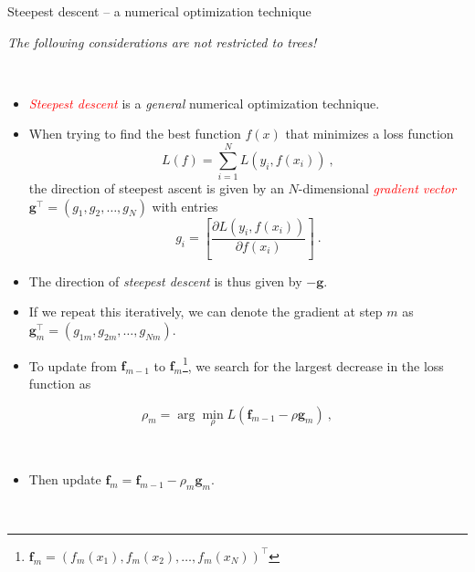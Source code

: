 \documentclass[
  10pt,
  ignorenonframetext,
]{beamer}
\providecommand{\tightlist}{%
  \setlength{\itemsep}{0pt}\setlength{\parskip}{0pt}}
\begin{document}
\begin{frame}
\begin{block}{Steepest descent -- a numerical optimization technique}
\protect\hypertarget{steepest-descent-a-numerical-optimization-technique}{}
\(~\)

\emph{The following considerations are not restricted to trees!}

\(~\)

\begin{itemize}
\tightlist
\item
  \emph{\textcolor{red}{Steepest descent}} is a \emph{general} numerical
  optimization technique.
\end{itemize}

\vspace{2mm}

\begin{itemize}
\tightlist
\item
  When trying to find the best function \(f(x)\) that minimizes a loss
  function \[L(f) = \sum_{i=1}^N L(y_i,f(x_i)) \ ,\] the direction of
  steepest ascent is given by an \(N\)-dimensional
  \emph{\textcolor{red}{gradient vector}}
  \(\mathbf{g}^\top = (g_{1},g_{2},\ldots, g_{N})\) with entries
  \[g_{i} = \left[ \frac{\partial L(y_i,f(x_i))}{\partial f(x_i)} \right] \ .\]
\end{itemize}

\vspace{2mm}

\begin{itemize}
\tightlist
\item
  The direction of \emph{steepest descent} is thus given by
  \(-\mathbf{g}\).
\end{itemize}
\end{block}
\end{frame}

\begin{frame}
\begin{itemize}
\tightlist
\item
  If we repeat this iteratively, we can denote the gradient at step
  \(m\) as \(\mathbf{g}_m^\top = (g_{1m},g_{2m},\ldots, g_{Nm})\).
\end{itemize}

\vspace{2mm}

\begin{itemize}
\tightlist
\item
  To update from \(\mathbf{f}_{m-1}\) to
  \(\mathbf{f}_m\)\footnote{$\mathbf{f}_m = (f_m(x_1),f_m(x_2),\ldots, f_m(x_N))^\top$ },
  we search for the largest decrease in the loss function as
\end{itemize}

\[\rho_m = \arg \min_\rho L(\mathbf{f}_{m-1} - \rho \mathbf{g}_m) \ , \]

\(~\)

\begin{itemize}
\tightlist
\item
  Then update \(\mathbf{f}_m = \mathbf{f}_{m-1} - \rho_m \mathbf{g}_m\).
\end{itemize}

\(~\)
\end{frame}
\end{document}
